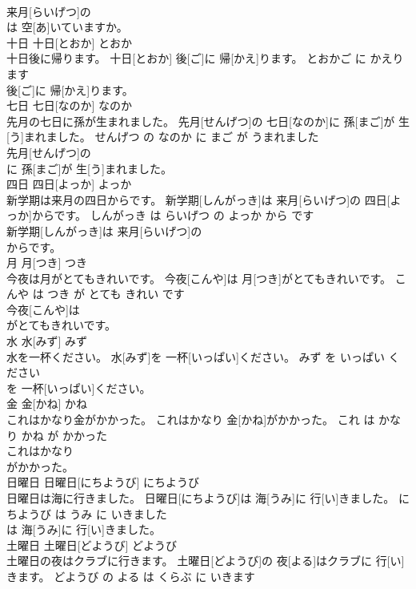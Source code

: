 \documentclass[8pt]{extreport}
\begin{document}
\begin{CJK}{UTF8}{min}
\\	来月[らいげつ]の
\\	は 空[あ]いていますか。		
\\	十日	十日[とおか]	とおか	
\\	十日後に帰ります。	十日[とおか] 後[ご]に 帰[かえ]ります。	とおかご に かえります	
\\	後[ご]に 帰[かえ]ります。		
\\	七日	七日[なのか]	なのか	
\\	先月の七日に孫が生まれました。	先月[せんげつ]の 七日[なのか]に 孫[まご]が 生[う]まれました。	せんげつ の なのか に まご が うまれました	
\\	先月[せんげつ]の
\\	に 孫[まご]が 生[う]まれました。		
\\	四日	四日[よっか]	よっか	
\\	新学期は来月の四日からです。	新学期[しんがっき]は 来月[らいげつ]の 四日[よっか]からです。	しんがっき は らいげつ の よっか から です	
\\	新学期[しんがっき]は 来月[らいげつ]の
\\	からです。		
\\	月	月[つき]	つき	
\\	今夜は月がとてもきれいです。	今夜[こんや]は 月[つき]がとてもきれいです。	こんや は つき が とても きれい です	
\\	今夜[こんや]は
\\	がとてもきれいです。		
\\	水	水[みず]	みず	
\\	水を一杯ください。	水[みず]を 一杯[いっぱい]ください。	みず を いっぱい ください	
\\	を 一杯[いっぱい]ください。		
\\	金	金[かね]	かね	
\\	これはかなり金がかかった。	これはかなり 金[かね]がかかった。	これ は かなり かね が かかった	
\\	これはかなり
\\	がかかった。		
\\	日曜日	日曜日[にちようび]	にちようび	
\\	日曜日は海に行きました。	日曜日[にちようび]は 海[うみ]に 行[い]きました。	にちようび は うみ に いきました	
\\	は 海[うみ]に 行[い]きました。		
\\	土曜日	土曜日[どようび]	どようび	
\\	土曜日の夜はクラブに行きます。	土曜日[どようび]の 夜[よる]はクラブに 行[い]きます。	どようび の よる は くらぶ に いきます	

\end{CJK}
\end{document}
